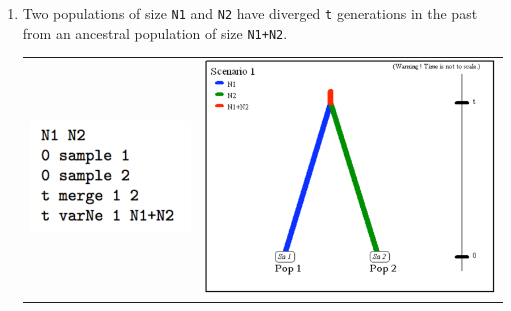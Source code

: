 \begin{enumerate}
\item Two populations of size \texttt{N1} and \texttt{N2} have diverged
\texttt{t} generations in the past from an ancestral population of
size \texttt{N1+N2}.\\



\begin{center}
\begin{tabular}{cc}
\includegraphics[scale=0.5]{code_scenario_02}  & \includegraphics[scale=0.35]{scenario_02} \tabularnewline
\end{tabular}
\par\end{center}


\end{enumerate}
